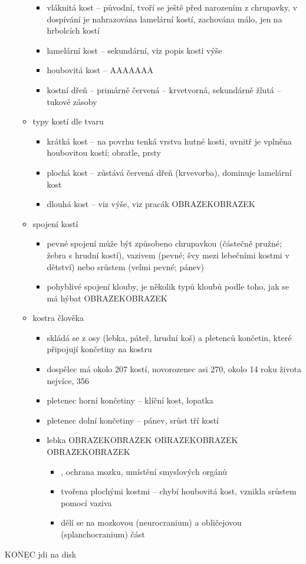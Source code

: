 \documentclass{article}
\begin{document}
\begin{itemize}
\begin{itemize}
\begin{itemize}
      \item vláknitá kost -- původní, tvoří se ještě před narozením z chrupavky, v dospívání je nahrazována lamelární kostí, zachována málo, jen na hrbolcích kostí
      \item lamelární kost -- sekundární, viz popis kosti výše
      \item houbovitá kost -- AAAAAAA
      \item kostní dřeň -- primárně červená -- krvetvorná, sekundárně žlutá -- tukové zásoby
    \end{itemize}
    \item typy kostí dle tvaru
    \begin{itemize}
      \item krátká kost -- na povrhu tenká vrstva hutné kosti, uvnitř je vplněna houbovitou kostí; obratle, prsty
      \item plochá kost -- zůstává červená dřeň (krvevorba), dominuje lamelární kost
      \item dlouhá kost -- viz výše, viz pracák OBRAZEKOBRAZEK
    \end{itemize}
    \item spojení kostí
    \begin{itemize}
      \item pevné spojení může být způsobeno chrupavkou (částečně pružné; žebra s hrudní kostí), vazivem (pevné; švy mezi lebečními kostmi v dětství) nebo srůstem (velmi pevné; pánev)
      \item pohyblivé spojení klouby, je několik typů kloubů podle toho, jak se má hýbat OBRAZEKOBRAZEK
    \end{itemize}
    \item kostra člověka
    \begin{itemize}
      \item skládá se z osy (lebka, páteř, hrudní koš) a pletenců končetin, které připojují končetiny na kostru
      \item dospělec má okolo 207 kostí, novorozenec asi 270, okolo 14 roku života nejvíce, 356
      \item pletenec horní končetiny -- klíční kost, lopatka
      \item pletenec dolní končetiny -- pánev, srůst tří kostí
      \item lebka OBRAZEKOBRAZEK OBRAZEKOBRAZEK OBRAZEKOBRAZEK
      \begin{itemize}
        \item {}, ochrana mozku, umístění smyslových orgánů
        \item tvořena plochými kostmi -- chybí houbovitá kost, vznikla srůstem pomocí vaziva
        \item dělí se na mozkovou (neurocranium) a obličejovou (splanchocranium) část
      \end{itemize}
    \end{itemize}
  \end{itemize}
\end{itemize}

KONEC jdi na disk
\end{document}
